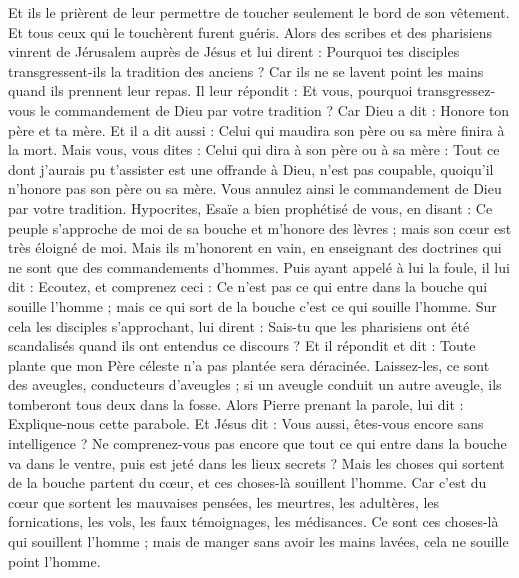 \begin{multicols}{2}
Et ils le prièrent de leur permettre de toucher seulement le bord de son vêtement. Et tous ceux qui le touchèrent furent guéris.
\VerseOne{}Alors des scribes et des pharisiens vinrent de Jérusalem auprès de Jésus et lui dirent :
Pourquoi tes disciples transgressent-ils la tradition des anciens ? Car ils ne se lavent point les mains quand ils prennent leur repas.
Il leur répondit : Et vous, pourquoi transgressez-vous le commandement de Dieu par votre tradition ?
Car Dieu a dit : Honore ton père et ta mère. Et il a dit aussi : Celui qui maudira son père ou sa mère finira à la mort.
Mais vous, vous dites : Celui qui dira à son père ou à sa mère : Tout ce dont j’aurais pu t’assister est une offrande à Dieu, n’est pas coupable, quoiqu’il n’honore pas son père ou sa mère.
Vous annulez ainsi le commandement de Dieu par votre tradition.
Hypocrites, Esaïe a bien prophétisé de vous, en disant :
Ce peuple s’approche de moi de sa bouche et m’honore des lèvres ; mais son cœur est très éloigné de moi.
 Mais ils m’honorent en vain, en enseignant des doctrines qui ne sont que des commandements d'hommes.
Puis ayant appelé à lui la foule, il lui dit : Ecoutez, et comprenez ceci :
Ce n'est pas ce qui entre dans la bouche qui souille l'homme ; mais ce qui sort de la bouche c'est ce qui souille l'homme.
Sur cela les disciples s'approchant, lui dirent : Sais-tu que les pharisiens ont été scandalisés quand ils ont entendus ce discours ?
Et il répondit et dit : Toute plante que mon Père céleste n'a pas plantée sera déracinée.
Laissez-les, ce sont des aveugles, conducteurs d’aveugles ; si un aveugle conduit un autre aveugle, ils tomberont tous deux dans la fosse.
Alors Pierre prenant la parole, lui dit : Explique-nous cette parabole.
Et Jésus dit : Vous aussi, êtes-vous encore sans intelligence ?
Ne comprenez-vous pas encore que tout ce qui entre dans la bouche va dans le ventre, puis est jeté dans les lieux secrets ?
Mais les choses qui sortent de la bouche partent du cœur, et ces choses-là souillent l’homme.
Car c’est du cœur que sortent les mauvaises pensées, les meurtres, les adultères, les fornications, les vols, les faux témoignages, les médisances.
Ce sont ces choses-là qui souillent l'homme ; mais de manger sans avoir les mains lavées, cela ne souille point l'homme.

\end{multicols}
